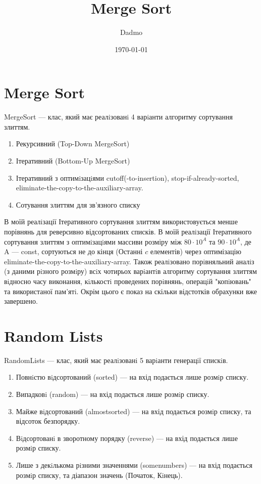 \documentclass{article}
\title{Merge Sort}
\author{Dadmo}
\date{\today}
\begin{document}
\maketitle

\tableofcontents 
\section{Merge Sort}
MergeSort --- клас, який має реалiзованi 4 варiанти алгоритму сортування злиттям. 
\begin{enumerate}
    \item Рекурсивний (Top-Down MergeSort)
    \item Ітеративний (Bottom-Up MergeSort)
    \item Ітеративний з оптимiзацiями cutoff(-to-insertion), stop-if-already-sorted, eliminate-the-copy-to-the-auxiliary-array.
    \item Сотування злиттям для зв’язного списку
\end{enumerate}
\indent В моїй реалiзації Ітеративного сортування злиттям використовується менше порівнянь для реверсивно відсортованих списків.
\newline
\indent В моїй реалiзації Ітеративного сортування злиттям з оптимiзацiями массиви розміру між $80 \cdot 10^A$  та $90 \cdot 10^A$, де A --- const, сортуються не до кінця (Останні $c$ елементів) через оптимізацію eliminate-the-copy-to-the-auxiliary-array.
\newline
\indent Також реалiзовано порiвняльний аналiз (з даними рiзного розмiру) всiх чотирьох варiантiв
алгоритму сортування злиттям вiдносно часу виконання, кiлькостi проведених
порiвнянь, операцiй "копiювань" та використаної пам’ятi. Окрім цього є показ на скільки відстотків обрахунки вже завершено.
\newline
\section{Random Lists}
RandomLists --- клас, який має реалiзованi 5 варiанти генерацiї спискiв.
\begin{enumerate}
    \item Повнiстю вiдсортований (sorted) --- на вхід подається лише розмiр списку.
    \item Випадковi (random) --- на вхід подається лише розмiр списку.
    \item Майже вiдсортований (almostsorted) --- на вхід подається розмiр списку, та відсоток безпорядку.
    \item Вiдсортованi в зворотному порядку (reverse) --- на вхід подається лише розмiр списку.
    \item Лише з декiлькома рiзними значеннями (somenumbers) --- на вхід подається розмiр списку, та діапазон значень (Початок, Кiнець).
\end{enumerate}
\end{document}
